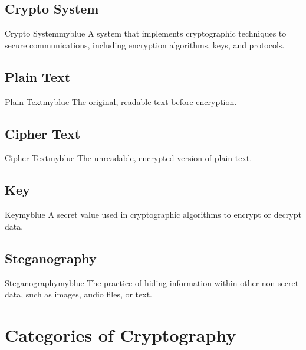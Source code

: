 \vspace{0.25cm}
\subsection{Crypto System}
\begin{prettyBox}{Crypto System}{myblue}
A system that implements cryptographic techniques to secure communications, including encryption algorithms, keys, and protocols.
\end{prettyBox}

\vspace{0.25cm}
\subsection{Plain Text}
\begin{prettyBox}{Plain Text}{myblue}
The original, readable text before encryption.
\end{prettyBox}

\vspace{0.25cm}
\subsection{Cipher Text}
\begin{prettyBox}{Cipher Text}{myblue}
The unreadable, encrypted version of plain text.
\end{prettyBox}

\vspace{0.25cm}
\subsection{Key}
\begin{prettyBox}{Key}{myblue}
A secret value used in cryptographic algorithms to encrypt or decrypt data.
\end{prettyBox}

\vspace{0.25cm}
\subsection{Steganography}
\begin{prettyBox}{Steganography}{myblue}
The practice of hiding information within other non-secret data, such as images, audio files, or text.
\end{prettyBox}


\vspace{1cm}

\section{Categories of Cryptography}

